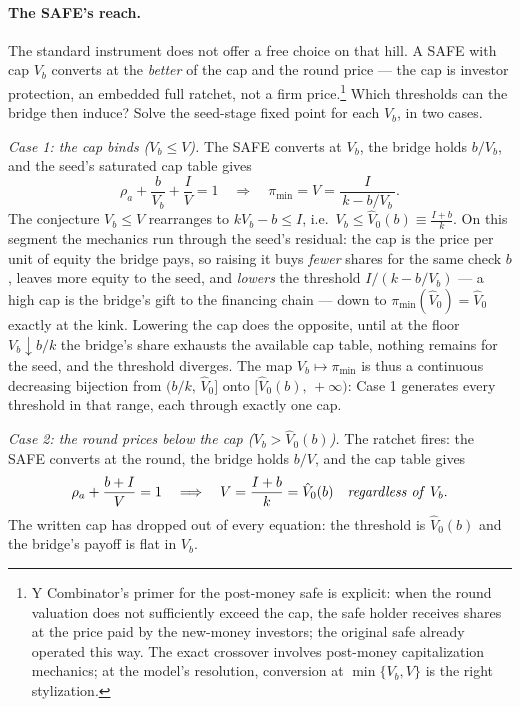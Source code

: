\documentclass[11pt]{article}
\theoremstyle{definition}
\newcommand{\pimin}{\pi_{\min}}
\begin{document}
\paragraph{The SAFE's reach.}
The standard instrument does not offer a free choice on that hill. A SAFE with cap $V_b$ converts at the \emph{better} of the cap and the round price --- the cap is investor protection, an embedded full ratchet, not a firm price.\footnote{Y Combinator's primer for the post-money safe is explicit: when the round valuation does not sufficiently exceed the cap, the safe holder receives shares at the price paid by the new-money investors; the original safe already operated this way. The exact crossover involves post-money capitalization mechanics; at the model's resolution, conversion at $\min\{V_b, V\}$ is the right stylization.} Which thresholds can the bridge then induce? Solve the seed-stage fixed point for each $V_b$, in two cases.

\emph{Case 1: the cap binds ($V_b\le V$).} The SAFE converts at $V_b$, the bridge holds $b/V_b$, and the seed's saturated cap table gives
\[
\rho_a+\frac{b}{V_b}+\frac{I}{V}=1
\quad\Longrightarrow\quad
\pimin=V=\frac{I}{\,k-b/V_b\,}.
\]
The conjecture $V_b\le V$ rearranges to $kV_b-b\le I$, i.e.\ $V_b\le\hat V_0(b)\equiv\tfrac{I+b}{k}$. On this segment the mechanics run through the seed's residual: the cap is the price per unit of equity the bridge pays, so raising it buys \emph{fewer} shares for the same check $b$, leaves more equity to the seed, and \emph{lowers} the threshold $I/(k-b/V_b)$ --- a high cap is the bridge's gift to the financing chain --- down to $\pimin(\hat V_0)=\hat V_0$ exactly at the kink. Lowering the cap does the opposite, until at the floor $V_b\downarrow b/k$ the bridge's share exhausts the available cap table, nothing remains for the seed, and the threshold diverges. The map $V_b\mapsto\pimin$ is thus a continuous decreasing bijection from $(b/k,\,\hat V_0]$ onto $[\hat V_0(b),\,+\infty)$: Case 1 generates every threshold in that range, each through exactly one cap.

\emph{Case 2: the round prices below the cap ($V_b>\hat V_0(b)$).} The ratchet fires: the SAFE converts at the round, the bridge holds $b/V$, and the cap table gives
\[
\rho_a+\frac{b+I}{V}=1
\quad\Longrightarrow\quad
V=\frac{I+b}{k}=\hat V_0(b)
\quad\text{\emph{regardless of} } V_b .
\]
The written cap has dropped out of every equation: the threshold is $\hat V_0(b)$ and the bridge's payoff is flat in $V_b$.
\end{document}

